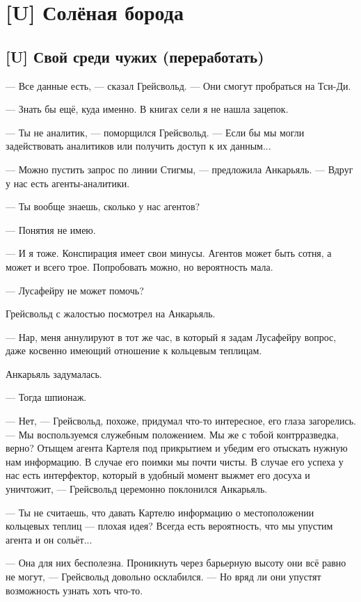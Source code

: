 \textspace

\chapter{[U] Солёная борода}


\section{[U] Свой среди чужих (переработать)}

\textspace

--- Все данные есть, --- сказал Грейсвольд.
--- Они смогут пробраться на Тси-Ди.

--- Знать бы ещё, куда именно.
В книгах сели я не нашла зацепок.

--- Ты не аналитик, --- поморщился Грейсвольд.
--- Если бы мы могли задействовать аналитиков или получить доступ к их данным...

--- Можно пустить запрос по линии Стигмы, --- предложила Анкарьяль.
--- Вдруг у нас есть агенты-аналитики.

--- Ты вообще знаешь, сколько у нас агентов?

--- Понятия не имею.

--- И я тоже.
Конспирация имеет свои минусы.
Агентов может быть сотня, а может и всего трое.
Попробовать можно, но вероятность мала.

--- Лусафейру не может помочь?

Грейсвольд с жалостью посмотрел на Анкарьяль.

--- Нар, меня аннулируют в тот же час, в который я задам Лусафейру вопрос, даже косвенно имеющий отношение к кольцевым теплицам.

Анкарьяль задумалась.

--- Тогда шпионаж.

--- Нет, --- Грейсвольд, похоже, придумал что-то интересное, его глаза загорелись.
--- Мы воспользуемся служебным положением.
Мы же с тобой контрразведка, верно?
Отыщем агента Картеля под прикрытием и убедим его отыскать нужную нам информацию.
В случае его поимки мы почти чисты.
В случае его успеха у нас есть интерфектор, который в удобный момент выжмет его досуха и уничтожит, --- Грейсвольд церемонно поклонился Анкарьяль.

--- Ты не считаешь, что давать Картелю информацию о местоположении кольцевых теплиц --- плохая идея?
Всегда есть вероятность, что мы упустим агента и он сольёт...

--- Она для них бесполезна.
Проникнуть через барьерную высоту они всё равно не могут, --- Грейсвольд довольно осклабился.
--- Но вряд ли они упустят возможность узнать хоть что-то.

